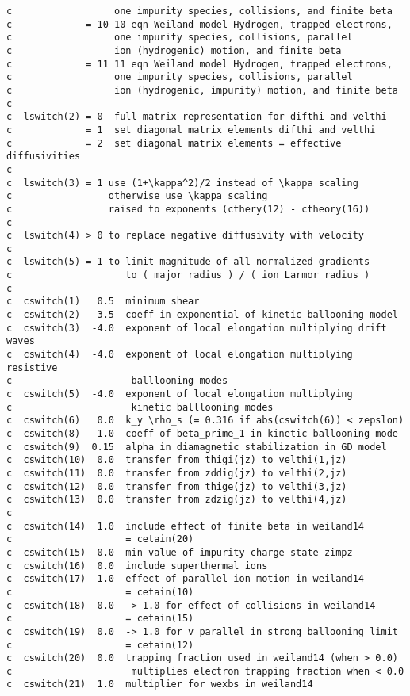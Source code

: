\begin{verbatim}
c                  one impurity species, collisions, and finite beta
c             = 10 10 eqn Weiland model Hydrogen, trapped electrons,
c                  one impurity species, collisions, parallel
c                  ion (hydrogenic) motion, and finite beta
c             = 11 11 eqn Weiland model Hydrogen, trapped electrons,
c                  one impurity species, collisions, parallel
c                  ion (hydrogenic, impurity) motion, and finite beta
c
c  lswitch(2) = 0  full matrix representation for difthi and velthi
c             = 1  set diagonal matrix elements difthi and velthi
c             = 2  set diagonal matrix elements = effective diffusivities
c
c  lswitch(3) = 1 use (1+\kappa^2)/2 instead of \kappa scaling
c                 otherwise use \kappa scaling
c                 raised to exponents (cthery(12) - ctheory(16))
c
c  lswitch(4) > 0 to replace negative diffusivity with velocity
c
c  lswitch(5) = 1 to limit magnitude of all normalized gradients
c                    to ( major radius ) / ( ion Larmor radius )
c
c  cswitch(1)   0.5  minimum shear
c  cswitch(2)   3.5  coeff in exponential of kinetic ballooning model
c  cswitch(3)  -4.0  exponent of local elongation multiplying drift waves
c  cswitch(4)  -4.0  exponent of local elongation multiplying resistive
c                     balllooning modes
c  cswitch(5)  -4.0  exponent of local elongation multiplying
c                     kinetic balllooning modes
c  cswitch(6)   0.0  k_y \rho_s (= 0.316 if abs(cswitch(6)) < zepslon)
c  cswitch(8)   1.0  coeff of beta_prime_1 in kinetic ballooning mode
c  cswitch(9)  0.15  alpha in diamagnetic stabilization in GD model
c  cswitch(10)  0.0  transfer from thigi(jz) to velthi(1,jz)
c  cswitch(11)  0.0  transfer from zddig(jz) to velthi(2,jz)
c  cswitch(12)  0.0  transfer from thige(jz) to velthi(3,jz)
c  cswitch(13)  0.0  transfer from zdzig(jz) to velthi(4,jz)
c
c  cswitch(14)  1.0  include effect of finite beta in weiland14 
c                    = cetain(20)
c  cswitch(15)  0.0  min value of impurity charge state zimpz
c  cswitch(16)  0.0  include superthermal ions
c  cswitch(17)  1.0  effect of parallel ion motion in weiland14 
c                    = cetain(10)
c  cswitch(18)  0.0  -> 1.0 for effect of collisions in weiland14 
c                    = cetain(15)
c  cswitch(19)  0.0  -> 1.0 for v_parallel in strong ballooning limit 
c                    = cetain(12)
c  cswitch(20)  0.0  trapping fraction used in weiland14 (when > 0.0)
c                     multiplies electron trapping fraction when < 0.0
c  cswitch(21)  1.0  multiplier for wexbs in weiland14

\end{verbatim}
